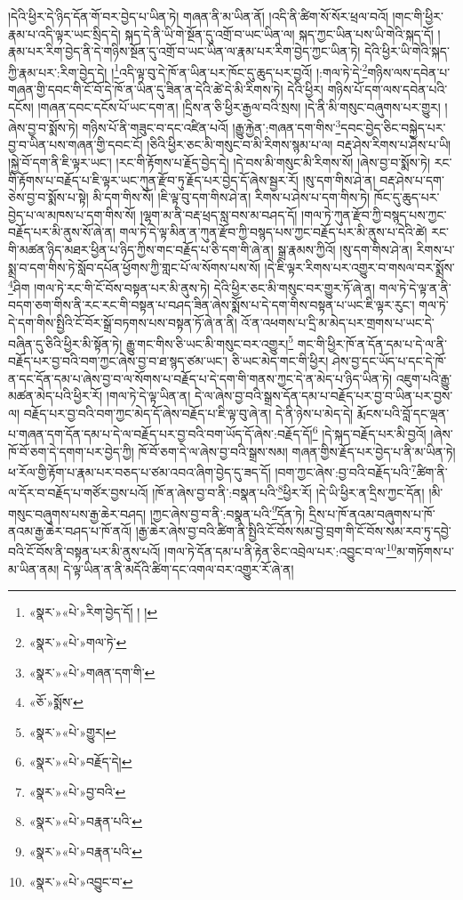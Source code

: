 །དེའི་ཕྱིར་དེ་ཉིད་དོན་གོ་བར་བྱེད་པ་ཡིན་ཏེ། གཞན་ནི་མ་ཡིན་ནོ། །འདི་ནི་ཚིག་སོ་སོར་ཕྲལ་བའོ། །གང་གི་ཕྱིར་རྣམ་པ་འདི་ལྟར་ཡང་སྲིད་དེ། སྐད་དེ་ནི་ཡི་གེ་སྔོན་དུ་འགྲོ་བ་ཡང་ཡིན་ལ། སྐད་ཀྱང་ཡིན་པས་ཡི་གེའི་སྐད་དོ། །རྣམ་པར་རིག་བྱེད་ནི་དེ་གཉིས་སྔོན་དུ་འགྲོ་བ་ཡང་ཡིན་ལ་རྣམ་པར་རིག་བྱེད་ཀྱང་ཡིན་ཏེ། དེའི་ཕྱིར་ཡི་གེའི་སྐད་ཀྱི་རྣམ་པར་:རིག་བྱེད་དེ། །\footnote{«སྣར་»«པེ་»རིག་བྱེད་དོ། ། །}འདི་ལྟ་བུ་དེ་ཁོ་ན་ཡིན་པར་ཁོང་དུ་ཆུད་པར་བྱའོ། །:གལ་ཏེ་དེ་\footnote{«སྣར་»«པེ་»གལ་ཏེ་}གཉིས་ལས་དབེན་པ་གཞན་གྱི་དབང་གི་ངོ་བོ་དེ་ཁོ་ན་ཡིན་དུ་ཟིན་ན་དེའི་ཚེ་དེ་མི་རིགས་ཏེ། དེའི་ཕྱིར། གཉིས་པོ་དག་ལས་དབེན་པའི་དངོས། །གཞན་དབང་དངོས་པོ་ཡང་དག་ན། །དྲིས་ན་ཅི་ཕྱིར་རྒྱལ་བའི་སྲས། །དེ་ནི་མི་གསུང་བཞུགས་པར་གྱུར། །
ཞེས་བྱ་བ་སྨོས་ཏེ། གཉིས་པོ་ནི་གཟུང་བ་དང་འཛིན་པའོ། །རྒྱུ་རྐྱེན་:གཞན་དག་གིས་\footnote{«སྣར་»«པེ་»གཞན་དག་གི་}དབང་བྱེད་ཅིང་བསྐྱེད་པར་བྱ་བ་ཡིན་པས་གཞན་གྱི་དབང་ངོ། །ཅིའི་ཕྱིར་ཅང་མི་གསུང་བ་མི་རིགས་སྙམ་པ་ལ། བརྡ་ཤེས་རིགས་པ་ཤེས་པ་ཡི། །སྐྱེ་བོ་དག་ནི་ཇི་ལྟར་ཡང་། །རང་གི་རྟོགས་པ་རྗོད་བྱེད་དེ། །དེ་བས་མི་གསུང་མི་རིགས་སོ། །ཞེས་བྱ་བ་སྨོས་ཏེ། རང་གི་རྟོགས་པ་བརྗོད་པ་ཇི་ལྟར་ཡང་ཀུན་རྫོབ་ཏུ་རྗོད་པར་བྱེད་དོ་ཞེས་སྦྱར་རོ། །སུ་དག་གིས་ཤེ་ན། བརྡ་ཤེས་པ་དག་ཅེས་བྱ་བ་སྨོས་པ་སྟེ། མི་དག་གིས་སོ། །ཇི་ལྟ་བུ་དག་གིས་ཤེ་ན། རིགས་པ་ཤེས་པ་དག་གིས་ཏེ། ཁོང་དུ་ཆུད་པར་བྱེད་པ་ལ་མཁས་པ་དག་གིས་སོ། །ལྷག་མ་ནི་བརྡ་ཕྲད་སླ་བས་མ་བཤད་དོ། །གལ་ཏེ་ཀུན་རྫོབ་ཀྱི་བསྙད་པས་ཀྱང་བརྗོད་པར་མི་ནུས་སོ་ཞེ་ན། གལ་ཏེ་དེ་ལྟ་མིན་ན་ཀུན་རྫོབ་ཀྱི་བསྙད་པས་ཀྱང་བརྗོད་པར་མི་ནུས་པ་དེའི་ཚེ། རང་གི་མཚན་ཉིད་མཐར་ཕྱིན་པ་ཉིད་ཀྱིས་གང་བརྗོད་པ་ཅི་དག་གི་ཞེ་ན། སྒྲ་རྣམས་ཀྱིའོ། །སུ་དག་གིས་ཤེ་ན། རིགས་པ་སྨྲ་བ་དག་གིས་ཏེ་སློབ་དཔོན་ཕྱོགས་ཀྱི་གླང་པོ་ལ་སོགས་པས་སོ། །དེ་ཇི་ལྟར་རིགས་པར་འགྱུར་བ་གསལ་བར་སྨྲོས་\footnote{«ཅོ་»སྨོས་}ཤིག །གལ་ཏེ་རང་གི་ངོ་བོས་བསྟན་པར་མི་ནུས་ཏེ། དེའི་ཕྱིར་ཅང་མི་གསུང་བར་གྱུར་ཏོ་ཞེ་ན། གལ་ཏེ་དེ་ལྟ་ན་ནི་བདག་ཅག་གིས་ནི་རང་རང་གི་བསྟན་པ་བཤད་ཟིན་ཞེས་སྨོས་པ་དེ་དག་གིས་བསྟན་པ་ཡང་ཇི་ལྟར་རུང་། གལ་ཏེ་དེ་དག་གིས་སྤྱིའི་ངོ་བོར་སྒྲོ་བཏགས་པས་བསྟན་ཏོ་ཞེ་ན་ནི། འོ་ན་འཕགས་པ་དྲི་མ་མེད་པར་གྲགས་པ་ཡང་དེ་བཞིན་དུ་ཅིའི་ཕྱིར་མི་སྟོན་ཏེ། རྒྱུ་གང་གིས་ཅི་ཡང་མི་གསུང་བར་འགྱུར།\footnote{«སྣར་»«པེ་»གྱུར།} གང་གི་ཕྱིར་ཁོ་ན་དོན་དམ་པ་དེ་ལ་ནི་བརྗོད་པར་བྱ་བའི་བག་ཀྱང་ཞེས་བྱ་བ་ཐ་སྙད་ཙམ་ཡང་། ཅི་ཡང་མེད་གང་གི་ཕྱིར། ཤེས་བྱ་དང་ཡོད་པ་དང་དེ་ཁོ་ན་དང་དོན་དམ་པ་ཞེས་བྱ་བ་ལ་སོགས་པ་བརྗོད་པ་དེ་དག་གི་གནས་ཀྱང་དེ་ན་མེད་པ་ཉིད་ཡིན་ཏེ། འཇུག་པའི་རྒྱུ་མཚན་མེད་པའི་ཕྱིར་རོ། །གལ་ཏེ་དེ་ལྟ་ཡིན་ན། དེ་ལ་ཞེས་བྱ་བའི་སྒྲས་དོན་དམ་པ་བརྗོད་པར་བྱ་བ་ཡིན་པར་བྱས་ལ། བརྗོད་པར་བྱ་བའི་བག་ཀྱང་མེད་དོ་ཞེས་བརྗོད་པ་ཇི་ལྟ་བུ་ཞེ་ན། དེ་ནི་ཉེས་པ་མེད་དེ། རྨོངས་པའི་བློ་དང་ལྡན་པ་གཞན་དག་དོན་དམ་པ་དེ་ལ་བརྗོད་པར་བྱ་བའི་བག་ཡོད་དོ་ཞེས་:བརྗོད་དོ།\footnote{«སྣར་»«པེ་»བརྗོད་དེ།} །དེ་སྐད་བརྗོད་པར་མི་བྱའོ། །ཞེས་ཁོ་བོ་ཅག་དེ་དགག་པར་བྱེད་ཀྱི། ཁོ་བོ་ཅག་དེ་ལ་ཞེས་བྱ་བའི་སྒྲས་སམ། གཞན་གྱིས་རྗོད་པར་བྱེད་པ་ནི་མ་ཡིན་ཏེ། ཕ་རོལ་གྱི་རྟོག་པ་རྣམ་པར་བཅད་པ་ཙམ་འབའ་ཞིག་བྱེད་དུ་ཟད་དོ། །བག་ཀྱང་ཞེས་:བྱ་བའི་བརྗོད་པའི་\footnote{«སྣར་»«པེ་»བྱ་བའི་}ཚིག་ནི་ལ་དོར་བ་བརྗོད་པ་གཙོར་བྱས་པའོ། །ཁོ་ན་ཞེས་བྱ་བ་ནི་:བསྣན་པའི་\footnote{«སྣར་»«པེ་»བརྣན་པའི་}ཕྱིར་རོ། །དེ་ཡི་ཕྱིར་ན་དྲིས་ཀྱང་དོན། །མི་གསུང་བཞུགས་པས་རྒྱ་ཆེར་བཤད། །ཀྱང་ཞེས་བྱ་བ་ནི་:བསྣན་པའི་\footnote{«སྣར་»«པེ་»བརྣན་པའི་}དོན་ཏེ། དྲིས་པ་ཁོ་ནའམ་བཞུགས་པ་ཁོ་ནའམ་རྒྱ་ཆེར་བཤད་པ་ཁོ་ནའོ། །རྒྱ་ཆེར་ཞེས་བྱ་བའི་ཚིག་ནི་སྤྱིའི་ངོ་བོས་སམ་བྱེ་བྲག་གི་ངོ་བོས་སམ་རབ་ཏུ་དབྱེ་བའི་ངོ་བོས་ནི་བསྟན་པར་མི་ནུས་པའོ། །གལ་ཏེ་དོན་དམ་པ་ནི་རྟེན་ཅིང་འབྲེལ་པར་:འབྱུང་བ་ལ་\footnote{«སྣར་»«པེ་»འབྱུང་བ་}མ་གཏོགས་པ་མ་ཡིན་ནམ། དེ་ལྟ་ཡིན་ན་ནི་མདོའི་ཚིག་དང་འགལ་བར་འགྱུར་རོ་ཞེ་ན། 